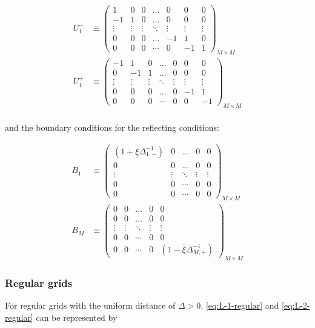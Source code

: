 \documentclass[11pt]{article}
\begin{document}
\begin{align}
U_1^{-} &\equiv \begin{pmatrix}
1  &0&0&\dots&0&0&0\\
-1&1&0&\dots&0&0&0\\
\vdots&\vdots&\vdots&\ddots&\vdots&\vdots&\vdots\\
0&0&0&\dots&-1&1&0\\
0&0&0&\cdots&0&-1&1
\end{pmatrix}_{M\times M}\label{eq:L-1-basis} \\
U_1^{+} &\equiv \begin{pmatrix}
-1  &1&0&\dots&0&0&0\\
0&-1&1&\dots&0&0&0\\
\vdots&\vdots&\vdots&\ddots&\vdots&\vdots&\vdots\\
0&0&0&\dots&0&-1&1\\
0&0&0&\cdots&0&0&-1
\end{pmatrix}_{M\times M}\label{eq:L-1+-basis} \\
\end{align}

and the boundary conditions for the reflecting conditions:

\begin{align}
B_{1}  &\equiv \begin{pmatrix}
(1 + \underline{\xi} \Delta^{-1}_{1,-}) &0&\dots&0&0\\
0&0&\dots&0&0\\
\vdots&\vdots&\ddots&\vdots&\vdots\\
0&0&\cdots&0&0\\
0&0&\cdots&0&0
\end{pmatrix}_{M\times M} \\
B_{M}  &\equiv \begin{pmatrix}
0 &0&\dots&0&0\\
0&0&\dots&0&0\\
\vdots&\vdots&\ddots&\vdots&\vdots\\
0&0&\cdots&0&0\\
0&0&\cdots&0&(1 - \overline{\xi} \Delta^{-1}_{M,+})
\end{pmatrix}_{M\times M}
\end{align}

\subsubsection{Regular grids}
For regular grids with the uniform distance of $\Delta > 0$, \eqref{eq:L-1-regular} and \eqref{eq:L-2-regular} can be represented by
\end{document}
